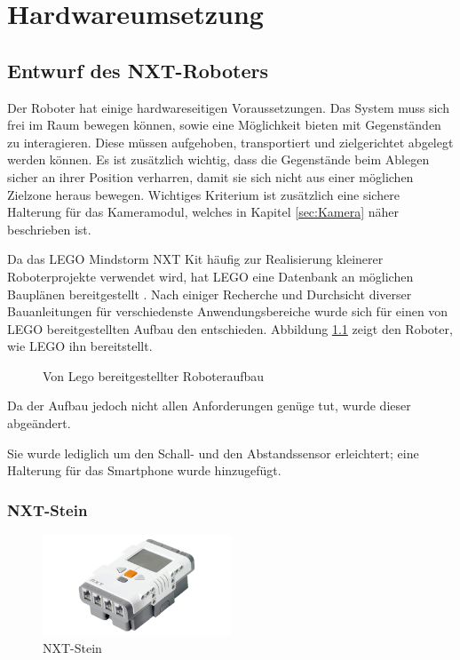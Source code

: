 \chapter{Hardwareumsetzung}
\label{cha:robot}
\section{Entwurf des NXT-Roboters}

Der Roboter hat einige hardwareseitigen Voraussetzungen. Das System muss sich frei im Raum bewegen können, sowie eine Möglichkeit bieten mit Gegenständen zu interagieren. Diese müssen aufgehoben, transportiert und zielgerichtet abgelegt werden können. Es ist zusätzlich wichtig, dass die Gegenstände beim Ablegen sicher an ihrer Position verharren, damit sie sich nicht aus einer möglichen Zielzone heraus bewegen. Wichtiges Kriterium ist zusätzlich eine sichere Halterung für das Kameramodul, welches in Kapitel \ref{sec:Kamera} näher beschrieben ist.

Da das LEGO Mindstorm NXT Kit häufig zur Realisierung kleinerer Roboterprojekte verwendet wird, hat LEGO eine Datenbank an möglichen Bauplänen bereitgestellt \cite{building_instructions}. Nach einiger Recherche und Durchsicht diverser Bauanleitungen für verschiedenste Anwendungsbereiche wurde sich für einen von LEGO bereitgestellten Aufbau den entschieden. Abbildung \ref{fig:standardRoboter} zeigt den Roboter, wie LEGO ihn bereitstellt.

\begin{figure}[h]
\centering
{}
\caption{Von Lego bereitgestellter Roboteraufbau}
\label{fig:standardRoboter}
\end{figure}


Da der Aufbau jedoch nicht allen Anforderungen genüge tut, wurde dieser abgeändert.

Sie wurde lediglich um den Schall- und den Abstandssensor erleichtert; eine Halterung für das Smartphone wurde hinzugefügt.


\pagebreak

\subsection{NXT-Stein}

\begin{figure}[h]
\centering
\includegraphics[width=0.5\textwidth]{Bilder/Robot/nxt_brick}
\caption{NXT-Stein}
\label{fig:nxtBrick}
\end{figure}

